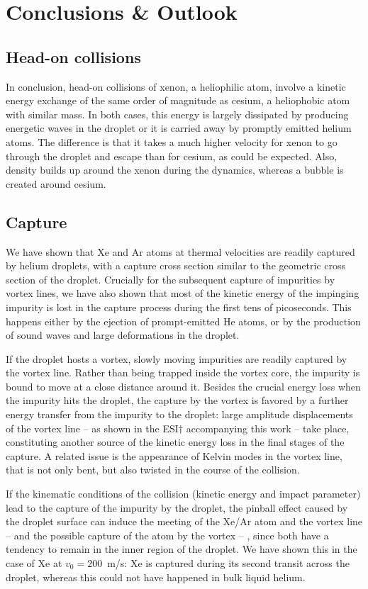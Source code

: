 \chapter{Conclusions \& Outlook}
	\section{Head-on collisions}
		In conclusion, head-on collisions of xenon, a heliophilic atom, involve a kinetic energy exchange of the same order of magnitude as cesium, a heliophobic atom with similar mass.
In both cases, this energy is largely dissipated by  producing energetic waves in the droplet or it is carried away by promptly emitted helium atoms.
The difference is that it takes a much higher velocity for xenon to go through the droplet and escape than for cesium, as could be expected.
Also, density builds up around the xenon during the dynamics, whereas a bubble is created around cesium.

	\section{Capture}
		We have shown
that Xe and Ar atoms at thermal velocities are readily captured by helium droplets, with a capture cross section similar to
 the geometric cross section of the droplet. Crucially for the subsequent capture of impurities by vortex lines,
we have also shown that most of the kinetic energy of the impinging impurity is lost in the capture process during the first tens of picoseconds. This happens either by the ejection of
 prompt-emitted He atoms, or by  the production of sound waves and large deformations in the droplet. 
 
If the droplet hosts a vortex,
slowly moving impurities are readily captured by the vortex line. 
Rather than being trapped inside the vortex core,
 the impurity is bound 
to move at a close distance around it.
Besides the crucial energy loss when the impurity hits the droplet,  the capture by the vortex is favored by a further
energy transfer  from the impurity to the droplet:  large amplitude 
displacements of the vortex line -- as shown in the ESI$\dag$ accompanying this work -- 
take place,  constituting another  source of the kinetic energy loss in the final stages of the capture.
A related issue is 
the appearance of Kelvin modes in the vortex line, that is not only bent,  but also twisted
in the course of the collision.

If the kinematic conditions of the collision (kinetic energy and impact parameter)  lead to the capture of the impurity by the droplet,   the pinball effect
caused by the droplet surface can induce
the meeting 
of the Xe/Ar atom and the vortex line -- and the possible capture of the atom by the vortex -- , since both have a tendency to remain in the inner region of the droplet. 
We have shown this in the case of Xe at $v_0=200$~m/s:
Xe is captured during its second transit across the droplet, whereas this could not have happened in bulk liquid helium.\cite{Psh16}  

